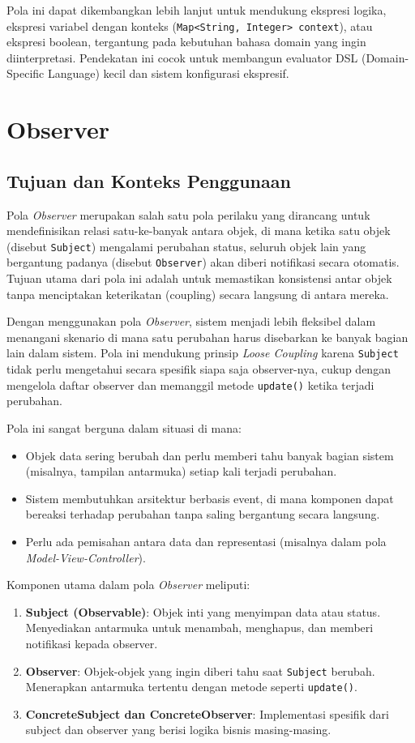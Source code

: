Pola ini dapat dikembangkan lebih lanjut untuk mendukung ekspresi logika, ekspresi variabel dengan konteks (\texttt{Map<String, Integer> context}), atau ekspresi boolean, tergantung pada kebutuhan bahasa domain yang ingin diinterpretasi. Pendekatan ini cocok untuk membangun evaluator DSL (Domain-Specific Language) kecil dan sistem konfigurasi ekspresif.


\section{Observer}

\subsection{Tujuan dan Konteks Penggunaan}

Pola \textit{Observer} merupakan salah satu pola perilaku yang dirancang untuk mendefinisikan relasi satu-ke-banyak antara objek, di mana ketika satu objek (disebut \texttt{Subject}) mengalami perubahan status, seluruh objek lain yang bergantung padanya (disebut \texttt{Observer}) akan diberi notifikasi secara otomatis. Tujuan utama dari pola ini adalah untuk memastikan konsistensi antar objek tanpa menciptakan keterikatan (coupling) secara langsung di antara mereka.

Dengan menggunakan pola \textit{Observer}, sistem menjadi lebih fleksibel dalam menangani skenario di mana satu perubahan harus disebarkan ke banyak bagian lain dalam sistem. Pola ini mendukung prinsip \textit{Loose Coupling} karena \texttt{Subject} tidak perlu mengetahui secara spesifik siapa saja observer-nya, cukup dengan mengelola daftar observer dan memanggil metode \texttt{update()} ketika terjadi perubahan.

Pola ini sangat berguna dalam situasi di mana:
\begin{itemize}
	\item Objek data sering berubah dan perlu memberi tahu banyak bagian sistem (misalnya, tampilan antarmuka) setiap kali terjadi perubahan.
	\item Sistem membutuhkan arsitektur berbasis event, di mana komponen dapat bereaksi terhadap perubahan tanpa saling bergantung secara langsung.
	\item Perlu ada pemisahan antara data dan representasi (misalnya dalam pola \textit{Model-View-Controller}).
\end{itemize}

Komponen utama dalam pola \textit{Observer} meliputi:
\begin{enumerate}
	\item \textbf{Subject (Observable)}: Objek inti yang menyimpan data atau status. Menyediakan antarmuka untuk menambah, menghapus, dan memberi notifikasi kepada observer.
	\item \textbf{Observer}: Objek-objek yang ingin diberi tahu saat \texttt{Subject} berubah. Menerapkan antarmuka tertentu dengan metode seperti \texttt{update()}.
	\item \textbf{ConcreteSubject dan ConcreteObserver}: Implementasi spesifik dari subject dan observer yang berisi logika bisnis masing-masing.
\end{enumerate}


